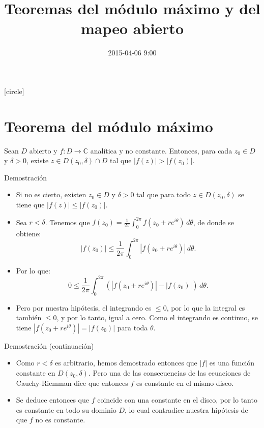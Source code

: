 \documentclass[spanish,presentation]{beamer}
\date{2015-04-06 9:00}
\title{Teoremas del módulo máximo y del mapeo abierto}
\begin{document}
\maketitle
{}
[circle]

\tableofcontents

\section{Teorema del módulo máximo}
\label{sec-1}

\begin{frame}[label=sec-1-1]{}
\begin{theorem}
Sean \(D\) abierto y \(f\colon D\to \mathbb{C}\) analítica y no
constante. Entonces, para cada \(z_{0}\in D\) y \(\delta>0\),
existe \(z\in D(z_{0},\delta)\cap D\) tal que
\(|f(z)|>|f(z_{0})|\).
\end{theorem}
\end{frame}

\begin{frame}[label=sec-1-2]{Demostración}
\begin{itemize}
\item Si no es cierto, existen \(z_{0}\in D\) y \(\delta>0\) tal que
para todo \(z\in D(z_{0},\delta)\) se tiene que
\(|f(z)|\leq |f(z_{0})|\).
\item Sea \(r<\delta\). Tenemos que
\(f(z_{0})=\frac{1}{2\pi}\int_{0}^{2\pi}f(z_{0}+re^{i\theta})\,d\theta\),
de donde se obtiene:
\begin{displaymath}
|f(z_{0})|\leq\frac{1}{2\pi}\int_{0}^{2\pi}|f(z_{0}+re^{i\theta})|\,d\theta.
\end{displaymath}
\item Por lo que:
\begin{displaymath}
0 \leq\frac{1}{2\pi}\int_{0}^{2\pi} (|f(z_{0}+re^{i\theta})|-|f(z_{0})|)\,d\theta.
\end{displaymath}
\item Pero por nuestra hipótesis, el integrando es \(\leq 0\), por lo
que la integral es también \(\leq 0\), y por lo tanto, igual a
cero. Como el integrando es continuo, se tiene
\(|f(z_{0}+re^{i\theta})|=|f(z_{0})|\) para toda \(\theta\).
\end{itemize}
\end{frame}

\begin{frame}[label=sec-1-3]{Demostración (continuación)}
\begin{itemize}
\item Como \(r<\delta\) es arbitrario, hemos demostrado entonces que
\(|f|\) es una función constante en \(D(z_{0},\delta)\). Pero una
de las consecuencias de las ecuaciones de Cauchy-Riemman dice que
entonces \(f\) es constante en el mismo disco.
\item Se deduce entonces que \(f\) coincide con una constante en el
disco, por lo tanto es constante en todo su dominio \(D\), lo
cual contradice nuestra hipótesis de que \(f\) no es constante.
\end{itemize}
\end{frame}
\end{document}
